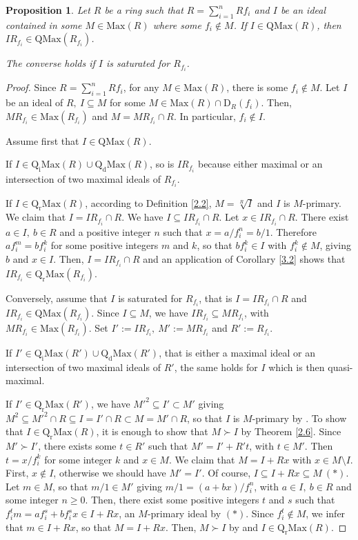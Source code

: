 \documentclass[12pt,leqno]{amsart}
\newtheorem{proposition}[theorem]{Proposition}
\theoremstyle{definition}
\begin{document}
\begin{proposition} \label{2.18} Let $R$ be a ring such that $R=\sum_{i= 1}^nRf_i$ and $I$ be an ideal contained in some $M\in\mathrm{Max}(R)$ where some $f_i\not\in M$. If $I\in\mathrm{QMax}(R)$, then $IR_{f_i}\in\mathrm{QMax}(R_{f_i})$. 

The converse holds if $I$ is saturated for $R_{f_i}$.

\end{proposition}
\begin{proof} Since $R=\sum_{i=1}^nRf_i$, for any $M\in\mathrm{Max}(R)$, there is some $f_i\not\in M$. Let $I$ be an ideal of $R,\ I\subseteq M$ for some $M\in\mathrm{Max}(R)\cap\mathrm{D}_R(f_i)$. Then, $MR_{f_i}\in\mathrm{Max}(R_{f_i})$ and $M=MR_{f_i}\cap R$. In particular, $f_i\not\in I$. 

Assume first that $I\in\mathrm{QMax}(R)$.  

If $I\in\mathrm{Q_iMax}(R)\cup\mathrm{Q_dMax}(R)$,  so is $IR_{f_i}$ because either maximal or an intersection of two maximal ideals of $R_{f_i}$.  

If $I\in\mathrm{Q_rMax}(R)$, according to Definition \ref{2.2}, $M=\sqrt[R]I$ and $I$ is $M$-primary. We claim that $I=IR_{f_i}\cap R$. We have $I\subseteq IR_{f_i}\cap R$. Let $x\in IR_{f_i}\cap R$. There exist $a\in I,\ b\in R$ and a positive integer $n$ such that $x=a/f_i^n=b/1$. Therefore $af_ i^m=bf_i^k$ for some positive integers $m$ and $k$, so that $bf_i^k\in I$ with $f_i^k\not\in M$, giving $b$ and $x\in I$. Then, $I=IR_{f_i}\cap R$ and an application of Corollary \ref{3.2} shows that $IR_{f_i}\in\mathrm {Q_rMax}(R_{f_i})$.

Conversely, assume that $I$ is saturated for $R_{f_i}$, that is $I=IR_{f_i}\cap R$ and $IR_{f_i}\in\mathrm{QMax}(R_{f_i})$. Since $I\subseteq M$, we have $IR_{f_i}\subseteq MR_{f_i}$, with $MR_{f_i}\in\mathrm{Max}(R_{f_i})$. Set $I':=IR_{f_i},\ M':=MR_{f_i}$ and $R':=R_{f_i}$.

If $I'\in\mathrm{Q_iMax}(R')\cup\mathrm{Q_dMax}(R')$, that is either a maximal ideal or an intersection of two maximal ideals of $R'$, the same holds for $I$ which is then quasi-maximal. 

If $I'\in\mathrm{Q_rMax}(R')$, we have $M'^2\subseteq I'\subset M'$ giving $M^2\subseteq M'^2\cap R\subseteq I=I'\cap R\subset M=M'\cap R$, so that $I$ is $M$-primary by \cite[Corollary 1, p.153]{ZS}. To show that $I\in\mathrm{Q_rMax}(R)$, it is enough to show that $M\succ I$ by Theorem \ref{2.6}. Since $M'\succ I'$, there exists some $t\in R'$ such that $M'=I'+R' t$, with $t\in M'$. Then $t=x/f_i^k$ for some integer $k$ and $x\in M$. We claim that $M=I+Rx$ with $x\in M\setminus I$. First, $x\not\in I$, otherwise we should have $M'=I'$. Of course, $I\subseteq I+Rx\subseteq M\ (*)$. Let $m\in M$, so that $m/1\in M'$ giving $m/1=(a+bx)/f_i^n$, with $a\in I,\ b\in R$ and some integer $n\geq 0$. Then, there exist some positive integers $ t$ and $s$ such that $f_i^tm=af_i^s+bf_i^sx\in I+Rx$, an $M$-primary ideal by $(*)$. Since $f_i^t\not\in M$, we infer that $m\in I+Rx$, so that $M =I+Rx$. Then, $M\succ I$ by \cite[Corollary 2, p.237]{ZS} and $I\in\mathrm{Q_rMax}(R)$. 
\end{proof} 
\end{document}

